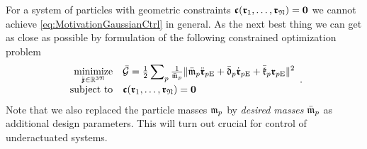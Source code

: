 For a system of particles with geometric constraints $\boldsymbol{\mathfrak{c}}(\boldsymbol{\mathfrak{r}}_{1},\ldots,\boldsymbol{\mathfrak{r}}_{\mathfrak{N}}) = \boldsymbol{0}$ we cannot achieve \eqref{eq:MotivationGaussianCtrl} in general.
As the next best thing we can get as close as possible by formulation of the following constrained optimization problem
\begin{align}\label{eq:CtrlGaussPrinciple}
 \begin{array}{rl}
  \underset{\ddot{\boldsymbol{\mathfrak{x}}} \in \mathbb{R}^{3\mathfrak{N}}}{\text{minimize}} & \bar{\mathcal{G}}
  = \tfrac{1}{2} \displaystyle \sum\nolimits_{p} \tfrac{1}{\bar{\mathfrak{m}}_{p}} \| \bar{\mathfrak{m}}_{p} \ddot{\boldsymbol{\mathfrak{r}}}_{p\mathrm{E}} + \bar{\mathfrak{d}}_{p} \dot{\boldsymbol{\mathfrak{r}}}_{p\mathrm{E}} + \bar{\mathfrak{k}}_{p} \boldsymbol{\mathfrak{r}}_{p\mathrm{E}} \|_{}^2
  \\[1ex]
  \text{subject to} & \boldsymbol{\mathfrak{c}}(\boldsymbol{\mathfrak{r}}_{1},\ldots,\boldsymbol{\mathfrak{r}}_{\mathfrak{N}}) = \boldsymbol{0}
 \end{array}.
\end{align}
Note that we also replaced the particle masses $\mathfrak{m}_{p}$ by \textit{desired masses} $\bar{\mathfrak{m}}_{p}$ as additional design parameters.
This will turn out crucial for control of underactuated systems.


